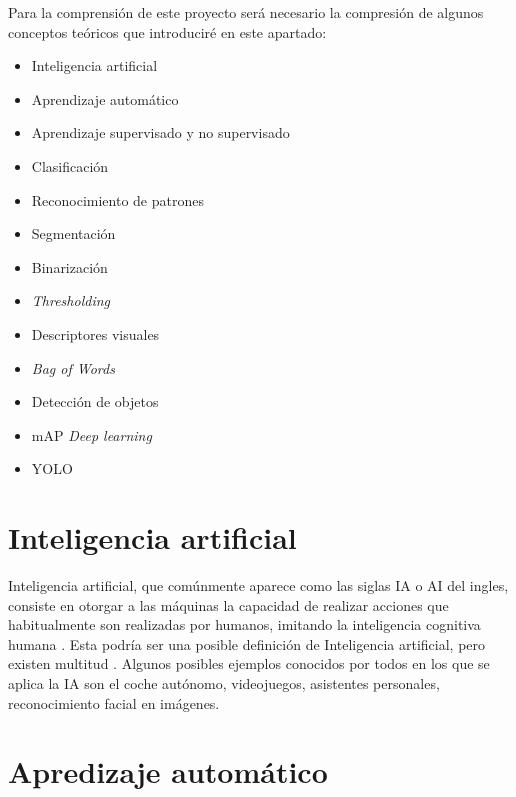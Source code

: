 

Para la comprensión de este proyecto será necesario la compresión de algunos conceptos teóricos que introduciré en este apartado:

\begin{itemize}
	\item Inteligencia artificial
	\item Aprendizaje automático
	\item Aprendizaje supervisado y no supervisado
	\item Clasificación
	\item Reconocimiento de patrones
	\item Segmentación
	\item Binarización
	\item \textit{Thresholding}
	\item Descriptores visuales
	\item \textit{Bag of Words}
	\item Detección de objetos
	\item mAP
	\textit{Deep learning}
	\item YOLO
\end{itemize}


\section{Inteligencia artificial}

Inteligencia artificial, que comúnmente aparece como las siglas IA o AI del ingles, consiste en otorgar a las máquinas la capacidad de realizar acciones que habitualmente son realizadas por humanos, imitando la inteligencia cognitiva humana \cite{alanturing:ai}. Esta podría ser una posible definición de Inteligencia artificial, pero existen multitud \cite{russell1995modern}. Algunos posibles ejemplos conocidos por todos en los que se aplica la IA son el coche autónomo, videojuegos, asistentes personales, reconocimiento facial en imágenes.

\section{Apredizaje automático}


